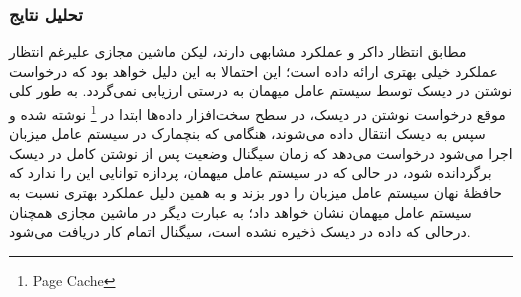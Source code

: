 \subsubsection{تحلیل نتایج}
مطابق انتظار داکر و  عملکرد مشابهی دارند، لیکن ماشین مجازی علیرغم انتظار
عملکرد خیلی بهتری ارائه داده است؛ این احتمالا به این دلیل خواهد بود که درخواست نوشتن در دیسک توسط
سیستم عامل میهمان به درستی ارزیابی نمی‌گردد. به طور کلی موقع درخواست نوشتن در دیسک، در سطح سخت‌افزار
داده‌ها ابتدا در \footnote{Page Cache} نوشته شده و سپس به دیسک انتقال داده می‌شوند، هنگامی که بنچمارک در سیستم عامل
میزبان اجرا می‌شود درخواست می‌دهد که زمان سیگنال وضعیت پس از نوشتن کامل در دیسک برگردانده شود، در حالی که در سیستم عامل میهمان،
پردازه توانایی این را ندارد که حافظهٔ نهان سیستم عامل میزبان را دور بزند و به همین دلیل عملکرد بهتری نسبت به سیستم عامل
میهمان نشان خواهد داد؛ به عبارت دیگر در ماشین مجازی همچنان درحالی که داده در دیسک ذخیره نشده است، سیگنال اتمام کار دریافت می‌شود.